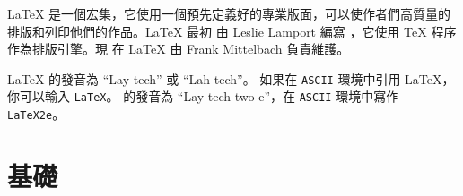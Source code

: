 \LaTeX{} 是一個宏集，它使用一個預先定義好的專業版面，可以使作者們高質量的排版和列印他們的作品。\LaTeX{} 最初
由 Leslie
Lamport 編寫 \cite{manual}，它使用 \TeX{} 程序作為排版引擎。現
在 \LaTeX{} 由 Frank Mittelbach 負責維護。



\LaTeX{} 的發音為 ``Lay-tech'' 或 ``Lah-tech''。
如果在 \texttt{ASCII} 環境中引用 \LaTeX{}，你可以輸入 \texttt{LaTeX}。
\LaTeXe{} 的發音為 ``Lay-tech two e''，在 \texttt{ASCII} 環境中寫作 \texttt{LaTeX2e}。



%

\section{基礎}

